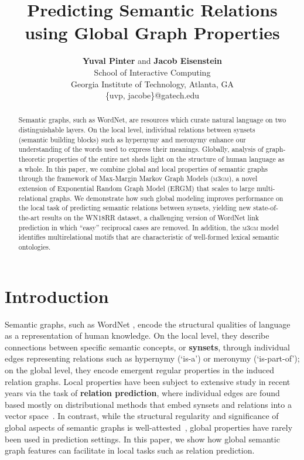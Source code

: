 \documentclass[11pt,twocolumn]{article}
\title{Predicting Semantic Relations using Global Graph Properties}
\author{\textbf{Yuval Pinter} and \textbf{Jacob Eisenstein}\\
		School of Interactive Computing\\
		Georgia Institute of Technology, Atlanta, GA\\
        \{uvp, jacobe\}@gatech.edu}
\date{}
\newcommand{\WN}[0]{WordNet}
\newcommand{\ergm}[0]{ERGM}
\newcommand{\sysname}[0]{\textsc{m3gm}}
\begin{document}
\maketitle
\begin{abstract}
Semantic graphs, such as \WN{}, are resources which curate natural language on two distinguishable layers.
On the local level, individual relations between synsets (semantic building blocks) such as hypernymy and meronymy enhance our understanding of the words used to express their meanings.
Globally, analysis of graph-theoretic properties of the entire net sheds light on the structure of human language as a whole.
In this paper, we combine global and local properties of semantic graphs through the framework of Max-Margin Markov Graph Models (\sysname{}), a novel extension of Exponential Random Graph Model (\ergm{}) that scales to large multi-relational graphs.
We demonstrate how such global modeling improves performance on the local task of predicting semantic relations between synsets, yielding new state-of-the-art results on the WN18RR dataset, a challenging version of WordNet link prediction in which ``easy'' reciprocal cases are removed.
In addition, the \sysname{} model identifies multirelational motifs that are characteristic of well-formed lexical semantic ontologies.

\end{abstract}

\section{Introduction}

Semantic graphs, such as \WN{} \cite{wordnet}, encode the structural qualities of language as a representation of human knowledge.
On the local level, they describe connections between specific semantic concepts, or \textbf{synsets}, through individual edges representing relations such as hypernymy (`is-a') or meronymy (`is-part-of');
on the global level, they encode emergent regular properties in the induced relation graphs.
Local properties have been subject to extensive study in recent years via the task of \textbf{relation prediction}, where individual edges are found based mostly on distributional methods that embed synsets and relations into a vector space~\cite[e.g.][]{SocherChenManningNg2013,bordes2013translating,toutanovachen2015,neelakantan2015compositional}.
In contrast, while the structural regularity and significance of global aspects of semantic graphs is well-attested~\cite{sigman2002global}, global properties have rarely been used in prediction settings.
In this paper, we show how global semantic graph features can facilitate in local tasks such as relation prediction.
\end{document}
